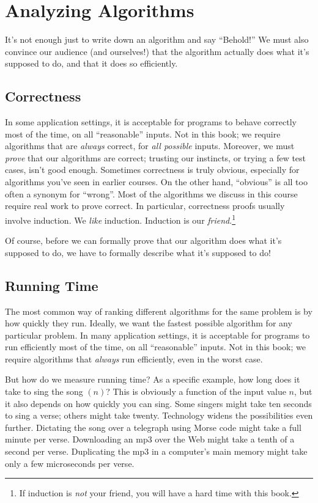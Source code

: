 \section{Analyzing Algorithms}
\label{sec:0.6}

It’s not enough just to write down an algorithm and say “Behold!” We must also convince our audience (and ourselves!) that the algorithm actually does what it’s supposed to do, and that it does so efficiently.

\subsection{Correctness}
In some application settings, it is acceptable for programs to behave correctly most of the time, on all “reasonable” inputs. Not in this book; we require algorithms that are \textit{always} correct, for \textit{all possible} inputs. Moreover, we must \textit{prove} that our algorithms are correct; trusting our instincts, or trying a few test cases, isn’t good enough. Sometimes correctness is truly obvious, especially for algorithms you’ve seen in earlier courses. On the other hand, “obvious” is all too often a synonym for “wrong”. Most of the algorithms we discuss in this course require real work to prove correct. In particular, correctness proofs usually involve induction. We \textit{like} induction. Induction is our \textit{friend}.\footnote{If induction is \textit{not} your friend, you will have a hard time with this book.}

Of course, before we can formally prove that our algorithm does what it’s supposed to do, we have to formally describe what it’s supposed to do!

\subsection{Running Time}
The most common way of ranking different algorithms for the same problem is by how quickly they run. Ideally, we want the fastest possible algorithm for any particular problem. In many application settings, it is acceptable for programs to run efficiently most of the time, on all “reasonable” inputs. Not in this book; we require algorithms that \textit{always} run efficiently, even in the worst case.

But how do we measure running time? As a specific example, how long does it take to sing the song $(n)$? This is obviously a function of the input value $n$, but it also depends on how quickly you can sing. Some singers might take ten seconds to sing a verse; others might take twenty. Technology widens the possibilities even further. Dictating the song over a telegraph using Morse code might take a full minute per verse. Downloading an mp3 over the Web might take a tenth of a second per verse. Duplicating the mp3 in a computer’s main memory might take only a few microseconds per verse.

